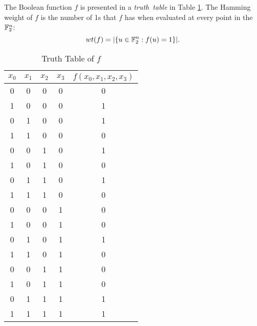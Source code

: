 \par The Boolean function $f$ is presented in a {\em truth\ table} in 
Table \ref{tab:truth-table}. The Hamming weight of $f$ is the number of 1s
that $f$ has when evaluated at every point in the $\mathbb{F}_2^n$: 
\[
wt(f)=\lvert\{u\in\mathbb{F}_2^n:f(u)=1\}\rvert.
\]
\begin{table}
	\centering
  \begin{tabular}{|c|c|c|c||c|}
    \hline
    $x_0$&$x_1$&$x_2$&$x_3$&$f(x_0,x_1,x_2,x_3)$\\
    \hline
    0&0&0&0&0\\
    1&0&0&0&1\\
    0&1&0&0&1\\
    1&1&0&0&0\\
    0&0&1&0&1\\
    1&0&1&0&0\\
    0&1&1&0&1\\
    1&1&1&0&0\\
    0&0&0&1&0\\
    1&0&0&1&0\\
    0&1&0&1&1\\
    1&1&0&1&0\\
    0&0&1&1&0\\
    1&0&1&1&0\\
    0&1&1&1&1\\
    1&1&1&1&1\\
  	\hline
	\end{tabular}
	\caption{Truth Table of $f$}
  \label{tab:truth-table}
\end{table}

